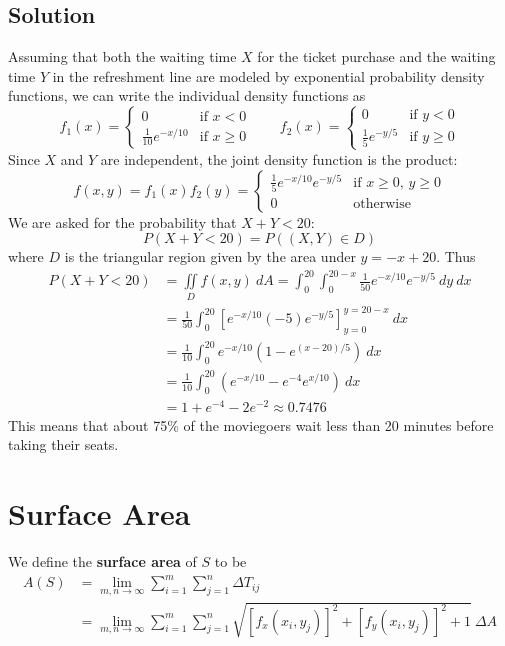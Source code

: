 \subsection*{Solution}
Assuming that both the waiting time $X$ for the ticket purchase and the waiting time
$Y$ in the refreshment line are modeled by exponential probability density functions,
we can write the individual density functions as
\[
    f_1(x) =
    \begin{cases}
        0                     & \text{if $x<0$}     \\
        \frac{1}{10}e^{-x/10} & \text{if $x\geq 0$}
    \end{cases} \qquad
    f_2(x) =
    \begin{cases}
        0                   & \text{if $y<0$}     \\
        \frac{1}{5}e^{-y/5} & \text{if $y\geq 0$}
    \end{cases}
\]
Since $X$ and $Y$ are independent, the joint density function is the product:
\[
    f(x,y)=f_1(x)f_2(y)=
    \begin{cases}
        \frac{1}{5}e^{-x/10}e^{-y/5} & \text{if $x\geq 0$, $y\geq 0$} \\
        0                            & \text{otherwise}
    \end{cases}
\]
We are asked for the probability that $X+Y<20$:
$$P(X+Y<20)=P((X,Y)\in D)$$
where $D$ is the triangular region given by the area under $y=-x+20$. Thus
\begin{align*}
    P(X+Y<20) & =\iint\limits_D f(x,y)\:dA=\int_0^{20}\int_0^{20-x}\frac{1}{50}e^{-x/10}e^{-y/5}\:dy\:dx \\
              & =\frac{1}{50}\int_0^{20}\left[e^{-x/10}(-5)e^{-y/5}\right]_{y=0}^{y=20-x}\:dx            \\
              & =\frac{1}{10}\int_0^{20}e^{-x/10}(1-e^{(x-20)/5})\:dx                                    \\
              & =\frac{1}{10}\int_0^{20}(e^{-x/10}-e^{-4}e^{x/10})\:dx                                   \\
              & =1+e^{-4}-2e^{-2}\approx 0.7476
\end{align*}
This means that about 75\% of the moviegoers wait less than 20 minutes before taking
their seats.

\section{Surface Area}
We define the \textbf{surface area} of $S$ to be
\begin{align*}
    A(S) & =\lim_{m,n\to\infty}\sum_{i=1}^m\sum_{j=1}^n \Delta T_{ij}                                       \\
         & =\lim_{m,n\to\infty}\sum_{i=1}^m\sum_{j=1}^n\sqrt{[f_x(x_i,y_j)]^2+[f_y(x_i,y_j)]^2+1}\:\Delta A
\end{align*}

